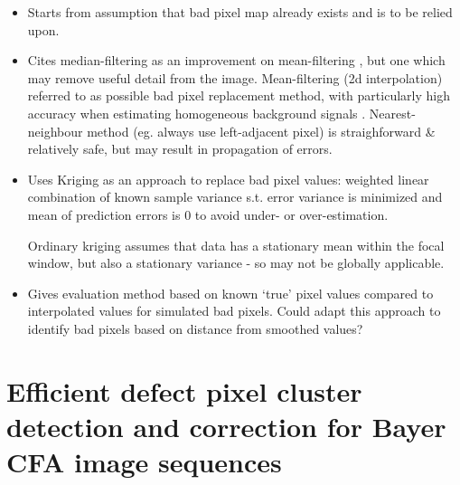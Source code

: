 \documentclass[10pt,fleqn]{article}
\begin{document}
\begin{itemize}

\item Starts from assumption that bad pixel map already exists and is to be relied upon.

\item
Cites median-filtering as an improvement on mean-filtering \cite{Dierickx1998}, but one which may remove useful detail from the image. Mean-filtering (2d interpolation) referred to as possible bad pixel replacement method, with particularly high accuracy when estimating homogeneous background signals \cite{Acito2005}. Nearest-neighbour method (eg. always use left-adjacent pixel) is straighforward \& relatively safe, but may result in propagation of errors. 


\item
Uses Kriging as an approach to replace bad pixel values: weighted linear combination of known sample variance s.t. error variance is minimized and mean of prediction errors is 0 to avoid under- or over-estimation. 

Ordinary kriging assumes that data has a stationary mean within the focal window, but also a stationary variance - so may not be globally applicable. 

\item Gives evaluation method based on known `true' pixel values compared to interpolated values for simulated bad pixels. Could adapt this approach to identify bad pixels based on distance from smoothed values?

\end{itemize}

\section{Efficient defect pixel cluster detection and correction for Bayer CFA image sequences \cite{Tajbakhsh2011}}
\end{document}
